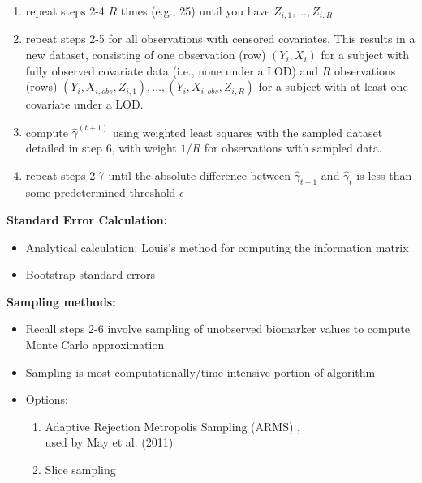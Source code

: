 \documentclass[xcolor=dvipsnames]{beamer}
\newcounter{tempcounter}
\begin{document}
\begin{frame}
\begin{enumerate}
  \setcounter{enumi}{\value{tempcounter}}
\item repeat steps 2-4 $R$ times (e.g., 25) until you have $Z_{i,1}, \dots, Z_{i,R}$
  \item repeat steps 2-5 for all observations with censored covariates.  This results in a new dataset, consisting of one observation (row) $(Y_i, X_i)$ for a subject with fully observed covariate data (i.e., none under a LOD) and $R$ observations (rows) $(Y_i, X_{i,obs}, Z_{i,1}), \dots, (Y_i, X_{i,obs}, Z_{i,R})$ for a subject with at least one covariate under a LOD.
  \item compute $\hat{\gamma}^{(t+1)}$ using weighted least squares with the sampled dataset detailed in step 6, with weight $1/R$ for observations with sampled data. 
  \item repeat steps 2-7 until the absolute difference between $\hat{\gamma}_{t-1}$ and $\hat{\gamma}_{t}$ is less than some predetermined threshold $\epsilon$
\end{enumerate}
\end{frame}

\begin{frame}
\textbf{Standard Error Calculation:}\\
\begin{itemize}
\item Analytical calculation: Louis's method for computing the information matrix \cite{louis_1982}
\item Bootstrap standard errors
\end{itemize}

\textbf{Sampling methods:}\\
\begin{itemize}
\item Recall steps 2-6 involve sampling of unobserved biomarker values to compute Monte Carlo approximation
\item Sampling is most computationally/time intensive portion of algorithm
\item Options:
\begin{enumerate}
\item Adaptive Rejection Metropolis Sampling (ARMS) \cite{gilks_1995},\\
used by May et al. (2011)
\item Slice sampling \cite{neal_2003}
\end{enumerate}
\end{itemize}
\end{frame}
\end{document}
